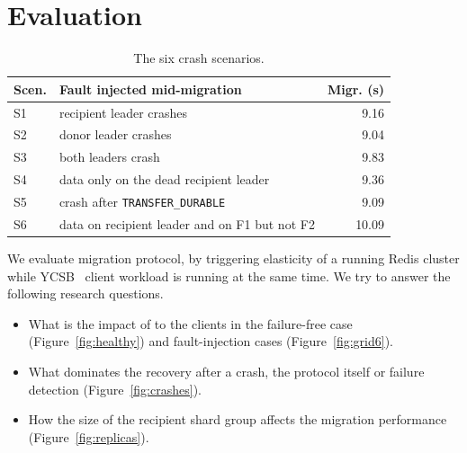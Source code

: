 \section{Evaluation}
\label{sec:evaluation}

\begin{table}[tb]
  \centering\small
  \setlength{\tabcolsep}{5pt}\renewcommand{\arraystretch}{1.22}
  \begin{tabular}{@{}l l r@{}}
    \toprule
    Scen. & Fault injected mid-migration & Migr. (s) \\
    \midrule
    S1  & recipient leader crashes            &  9.16 \\
    S2  & donor leader crashes                &  9.04 \\
    S3  & both leaders crash                  &  9.83 \\
    \addlinespace[3pt]
    S4  & data only on the dead recipient leader      &  9.36 \\
    S5  & crash after \texttt{TRANSFER\_DURABLE} &  9.09 \\
    S6  & data on recipient leader and on F1 but not F2  & 10.09 \\
    \bottomrule
  \end{tabular}
  \caption{The six crash scenarios.}
  \label{tab:scenarios}
\end{table}

We evaluate \OurImplementation{} migration protocol, by triggering elasticity of a running Redis cluster while YCSB~\cite{ycsb} client workload is running at the same time.
We try to answer the following research questions.
\begin{itemize}
  \item What is the impact of \OurImplementation{} to the clients in the failure-free case (Figure~\ref{fig:healthy}) and fault-injection cases (Figure~\ref{fig:grid6}).
  \item What dominates the recovery after a crash, the protocol itself or failure detection (Figure~\ref{fig:crashes}).
  \item How the size of the recipient shard group affects the migration performance (Figure~\ref{fig:replicas}).
\end{itemize}

